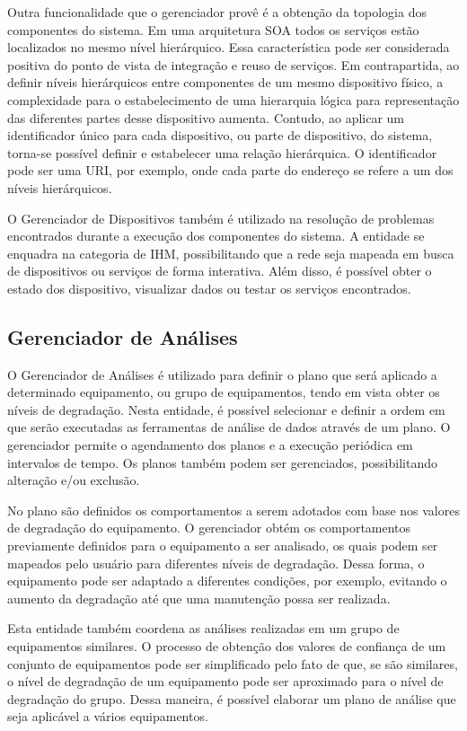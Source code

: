 Outra funcionalidade que o gerenciador provê é a obtenção da topologia dos componentes do sistema.
Em uma arquitetura \gls{SOA} todos os serviços estão localizados no mesmo nível hierárquico. Essa
característica pode ser considerada positiva do ponto de vista de integração e reuso de serviços. Em
contrapartida, ao definir níveis hierárquicos entre componentes de um mesmo dispositivo físico, a
complexidade para o estabelecimento de uma hierarquia lógica para representação das diferentes
partes desse dispositivo aumenta. Contudo, ao aplicar um identificador único para cada dispositivo,
ou parte de dispositivo, do sistema, torna-se possível definir e estabelecer uma relação
hierárquica. O identificador pode ser uma \gls{URI}, por exemplo, onde cada parte do endereço se
refere a um dos níveis hierárquicos.

O Gerenciador de Dispositivos também é utilizado na resolução de problemas encontrados durante a
execução dos componentes do sistema. A entidade se enquadra na categoria de \gls{IHM},
possibilitando que a rede seja mapeada em busca de dispositivos ou serviços de forma interativa.
Além disso, é possível obter o estado dos dispositivo, visualizar dados ou testar os serviços
encontrados.


\subsection{Gerenciador de Análises}
\label{sub:proposta-gerenciador-analises}

O Gerenciador de Análises é utilizado para definir o plano que será aplicado a determinado
equipamento, ou grupo de equipamentos, tendo em vista obter os níveis de degradação. Nesta entidade,
é possível selecionar e definir a ordem em que serão executadas as ferramentas de análise de dados
através de um plano. O gerenciador permite o agendamento dos planos e a execução periódica em
intervalos de tempo. Os planos também podem ser gerenciados, possibilitando alteração e/ou exclusão.

No plano são definidos os comportamentos a serem adotados com base nos valores de degradação do
equipamento. O gerenciador obtém os comportamentos previamente definidos para o equipamento a ser
analisado, os quais podem ser mapeados pelo usuário para diferentes níveis de degradação. Dessa
forma, o equipamento pode ser adaptado a diferentes condições, por exemplo, evitando o aumento da
degradação até que uma manutenção possa ser realizada.

Esta entidade também coordena as análises realizadas em um grupo de equipamentos similares. O
processo de obtenção dos valores de confiança de um conjunto de equipamentos pode ser simplificado
pelo fato de que, se são similares, o nível de degradação de um equipamento pode ser aproximado para
o nível de degradação do grupo. Dessa maneira, é possível elaborar um plano de análise que seja
aplicável a vários equipamentos.


